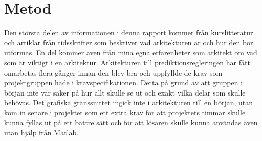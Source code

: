 \section{Metod}
Den största delen av informationen i denna rapport kommer från kurslitteratur och artiklar från tidsskrifter som beskriver vad arkitekturen är och hur den bör utformas. En del kommer även från mina egna erfarenheter som arkitekt om vad som är viktigt i en arkitektur.
\newline
\newline
Arkitekturen till prediktionsregleringen har fått omarbetas flera gånger innan den blev bra och uppfyllde de krav som projektgruppen hade i kravspecifikationen. Detta på grund av att gruppen i början inte var säker på hur allt skulle se ut och exakt vilka delar som skulle behövas. Det grafiska gränssnittet ingick inte i arkitekturen till en början, utan kom in senare i projektet som ett extra krav för att projektets timmar skulle kunna fyllas ut på ett bättre sätt och för att lösaren skulle kunna användas även utan hjälp från Matlab.

 
